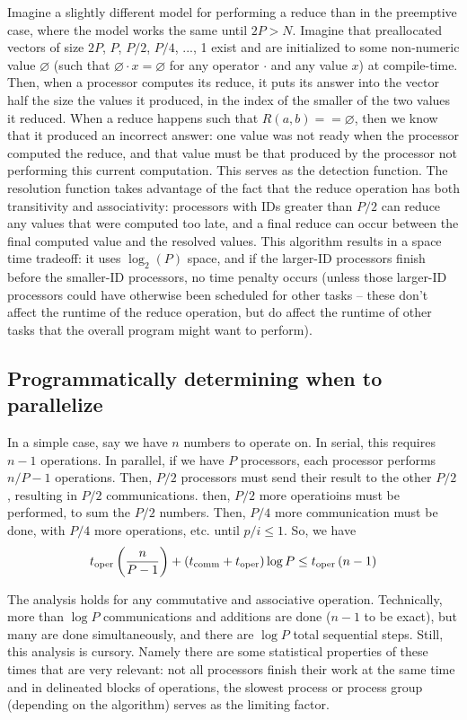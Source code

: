 Imagine a slightly different model for performing a reduce than in the
preemptive case, where the model works the same until $2P > N$. Imagine that
preallocated vectors of size $2P$, $P$, $P/2$, $P/4$, ..., 1 exist and are
initialized to some non-numeric value $\varnothing$ (such that $\varnothing
\cdot x = \varnothing$ for any operator $\cdot$ and any value $x$) at
compile-time. Then, when a processor computes its reduce, it puts its answer
into the vector half the size the values it produced, in the index of the
smaller of the two values it reduced. When a reduce happens such that $R(a,b) ==
\varnothing$, then we know that it produced an incorrect answer: one value was
not ready when the processor computed the reduce, and that value must be that
produced by the processor not performing this current computation. This serves
as the detection function. The resolution function takes advantage of the fact
that the reduce operation has both transitivity and associativity: processors
with IDs greater than $P/2$ can reduce any values that were computed too late,
and a final reduce can occur between the final computed value and the resolved
values. This algorithm results in a space time tradeoff: it uses $\log_2(P)$
space, and if the larger-ID processors finish before the smaller-ID processors,
no time penalty occurs (unless those larger-ID processors could have otherwise
been scheduled for other tasks -- these don't affect the runtime of the reduce
operation, but do affect the runtime of other tasks that the overall program
might want to perform).

\subsection{Programmatically determining when to parallelize}
In a simple case, say we have $n$ numbers to operate on. In serial, this
requires $n-1$ operations. In parallel, if we have $P$ processors, each
processor performs $n/P - 1$ operations. Then, $P/2$ processors must send their
result to the other $P/2$, resulting in $P/2$ communications. then, $P/2$ more
operatioins must be performed, to sum the $P/2$ numbers. Then, $P/4$ more
communication must be done, with $P/4$ more operations, etc. until $p/i \leq 1$.
So, we have
\begin{align*}
t_\mathrm{oper}\left(\frac{n}{P-1}\right) + \left(t_\mathrm{comm} + t_\mathrm{oper}\right)\log{P} \leq t_\mathrm{oper}\left(n-1\right)
\end{align*}

The analysis holds for any commutative and associative operation. Technically,
more than $\log{P}$ communications and additions are done ($n-1$ to be exact),
but many are done simultaneously, and there are $\log{P}$ total sequential
steps. Still, this analysis is cursory. Namely there are some statistical
properties of these times that are very relevant: not all processors finish
their work at the same time and in delineated blocks of operations, the slowest
process or process group (depending on the algorithm) serves as the limiting
factor.

